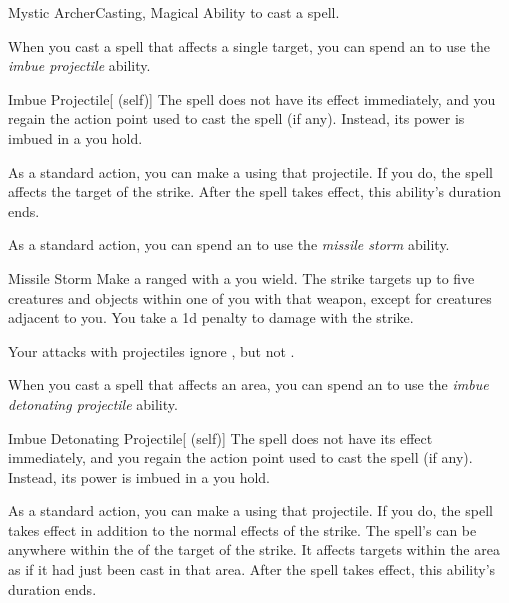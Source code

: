     \begin{feat}{Mystic Archer}{Casting, Magical}
        \featpre Ability to cast a spell.

         When you cast a spell that affects a single target, you can spend an  to use the \textit{imbue projectile} ability.
        \begin{ability}{Imbue Projectile}[ (self)]
            The spell does not have its effect immediately, and you regain the action point used to cast the spell (if any).
            Instead, its power is imbued in a  you hold. 

            As a standard action, you can make a  using that projectile.
            If you do, the spell affects the target of the strike.
            After the spell takes effect, this ability's duration ends.
        \end{ability}

         As a standard action, you can spend an  to use the \textit{missile storm} ability.
        \begin{ability}{Missile Storm}
            Make a ranged  with a  you wield.
            The strike targets up to five creatures and objects within one  of you with that weapon, except for creatures adjacent to you.
            You take a \minus1d penalty to damage with the strike.
        \end{ability}

         Your attacks with projectiles ignore , but not .

         When you cast a spell that affects an area, you can spend an  to use the \textit{imbue detonating projectile} ability.
        \begin{ability}{Imbue Detonating Projectile}[ (self)]
            The spell does not have its effect immediately, and you regain the action point used to cast the spell (if any).
            Instead, its power is imbued in a  you hold. 

            As a standard action, you can make a  using that projectile.
            If you do, the spell takes effect in addition to the normal effects of the strike.
            The spell's  can be anywhere within the  of the target of the strike.
            It affects targets within the area as if it had just been cast in that area.
            After the spell takes effect, this ability's duration ends.
        \end{ability}


\end{feat}
